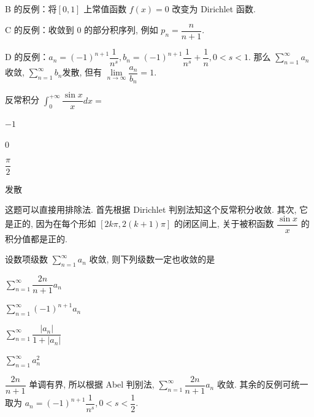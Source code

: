 \begin{solution}
  B 的反例：将$[0, 1]$ 上常值函数 $f(x) = 0$ 改变为 Dirichlet 函数.

  C 的反例：收敛到 $0$ 的部分积序列, 例如 $p_n = \dfrac{n}{n+1}.$

  D 的反例：$a_n = (-1)^{n+1} \dfrac{1}{n^s}, b_n = (-1)^{n+1} \dfrac{1}{n^s} + \dfrac{1}{n}, 0 < s < 1.$ 那么 $\sum\limits_{n=1}^{\infty} a_n$ 收敛, $\sum\limits_{n=1}^{\infty} b_n$发散, 但有 $\lim\limits_{n\to\infty} \dfrac{a_n}{b_n} = 1.$
\end{solution}

\begin{question}
  反常积分 $\int_0^{+\infty} \dfrac{\sin x}{x} dx =$ \paren[C]

  \begin{choices}
    \item $-1$
    \item $0$
    \item $\dfrac{\pi}{2}$
    \item 发散
  \end{choices}
\end{question}

\begin{solution}
  这题可以直接用排除法. 首先根据 Dirichlet 判别法知这个反常积分收敛. 其次, 它是正的, 因为在每个形如 $[2k\pi, 2(k+1)\pi]$ 的闭区间上, 关于被积函数 $\dfrac{\sin x}{x}$ 的积分值都是正的.
\end{solution}

\begin{question}
  设数项级数 $\sum\limits_{n=1}^{\infty} a_n$ 收敛, 则下列级数一定也收敛的是 \paren[A]

  \begin{choices}
    \item $\sum\limits_{n=1}^{\infty} \dfrac{2n}{n + 1} a_n$
    \item $\sum\limits_{n=1}^{\infty} (-1)^{n+1} a_n$
    \item $\sum\limits_{n=1}^{\infty} \dfrac{\lvert a_n \rvert}{1 + \lvert a_n \rvert}$
    \item $\sum\limits_{n=1}^{\infty} a_n^2$
  \end{choices}
\end{question}

\begin{solution}
  $\dfrac{2n}{n + 1}$ 单调有界, 所以根据 Abel 判别法, $\sum\limits_{n=1}^{\infty} \dfrac{2n}{n + 1} a_n$ 收敛. 其余的反例可统一取为 $a_n = (-1)^{n+1} \dfrac{1}{n^s}, 0 < s < \dfrac{1}{2}.$
\end{solution}

